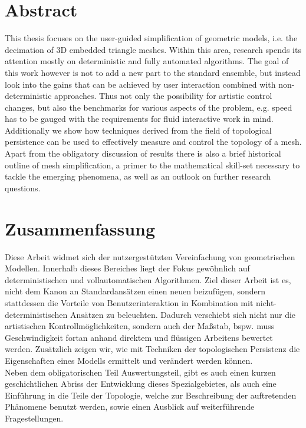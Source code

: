 \section*{Abstract}
\label{abstract}

This thesis focuses on the user-guided simplification of geometric models, i.e. the decimation of 3D embedded triangle meshes.
Within this area, research spends its attention mostly on deterministic and fully automated algorithms.
The goal of this work however is not to add a new part to the standard ensemble, but instead look into the gains that can be achieved by user interaction combined with non-deterministic approaches.
Thus not only the possibility for artistic control changes, but also the benchmarks for various aspects of the problem, e.g. speed has to be gauged with the requirements for fluid interactive work in mind.
Additionally we show how techniques derived from the field of topological persistence can be used to effectively measure and control the topology of a mesh.\\
Apart from the obligatory discussion of results there is also a brief historical outline of mesh simplification, a primer to the mathematical skill-set necessary to tackle the emerging phenomena, as well as an outlook on further research questions.\\[1ex]

\section*{Zusammenfassung}
\label{zusammenfassung}

Diese Arbeit widmet sich der nutzergestützten Vereinfachung von geometrischen Modellen.
Innerhalb dieses Bereiches liegt der Fokus gewöhnlich auf deterministischen und vollautomatischen Algorithmen.
Ziel dieser Arbeit ist es, nicht dem Kanon an Standardansätzen einen neuen beizufügen, sondern stattdessen die Vorteile von Benutzerinteraktion in Kombination mit nicht-deterministischen Ansätzen zu beleuchten. 
Dadurch verschiebt sich nicht nur die artistischen Kontrollmöglichkeiten, sondern auch der Maßstab, bspw. muss Geschwindigkeit fortan anhand direktem und flüssigen Arbeitens bewertet werden.
Zusätzlich zeigen wir, wie mit Techniken der topologischen Persistenz die Eigenschaften eines Modells ermittelt und verändert werden können.\\
Neben dem obligatorischen Teil Auswertungsteil, gibt es auch einen kurzen geschichtlichen Abriss der Entwicklung dieses Spezialgebietes, als auch eine Einführung in die Teile der Topologie, welche zur Beschreibung der auftretenden Phänomene benutzt werden, sowie einen Ausblick auf weiterführende Fragestellungen. 
